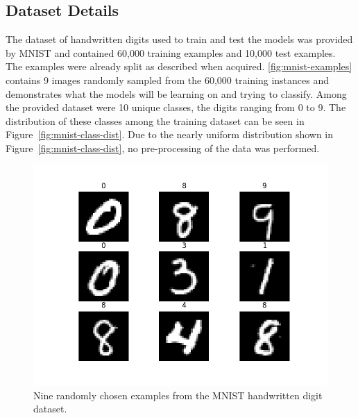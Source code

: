 \documentclass[a4paper]{article}
\begin{document}
\subsection{Dataset Details}
The dataset of handwritten digits used to train and test the models was provided by MNIST and contained 60,000 training examples and 10,000 test examples. The examples were already split as described when acquired. \autoref{fig:mnist-examples} contains 9 images randomly sampled from the 60,000 training instances and demonstrates what the models will be learning on and trying to classify. Among the provided dataset were 10 unique classes, the digits ranging from 0 to 9. The distribution of these classes among the training dataset can be seen in Figure~\ref{fig:mnist-class-dist}. Due to the nearly uniform distribution shown in Figure~\ref{fig:mnist-class-dist}, no pre-processing of the data was performed.

\begin{figure}[h!]
    \centering
    \includegraphics[scale=0.5]{images/mnist-examples.png}
    \caption{Nine randomly chosen examples from the MNIST handwritten digit dataset.}
    \label{fig:mnist-examples}
\end{figure}
\end{document}
